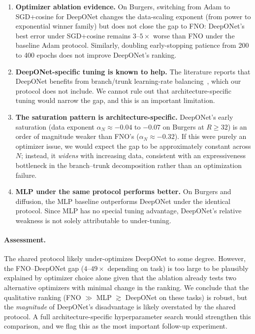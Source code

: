 \documentclass[11pt]{article}
\begin{document}
\begin{enumerate}[leftmargin=*,itemsep=2pt]
  \item \textbf{Optimizer ablation evidence.}
    On Burgers, switching from Adam to SGD+cosine for DeepONet
    changes the data-scaling exponent (from power to exponential
    winner family) but does not close the gap to FNO: DeepONet's
    best error under SGD+cosine remains $3$--$5\times$ worse than
    FNO under the baseline Adam protocol.
    Similarly, doubling early-stopping patience from 200 to 400
    epochs does not improve DeepONet's ranking.

  \item \textbf{DeepONet-specific tuning is known to help.}
    The literature reports that DeepONet benefits from
    branch/trunk learning-rate balancing~\citep{wang2021learning},
    which our protocol does not include.
    We cannot rule out that architecture-specific tuning would
    narrow the gap, and this is an important limitation.

  \item \textbf{The saturation pattern is architecture-specific.}
    DeepONet's early saturation (data exponent $\alpha_N \approx
    -0.04$ to $-0.07$ on Burgers at $R \geq 32$) is an order of
    magnitude weaker than FNO's ($\alpha_N \approx -0.32$).
    If this were purely an optimizer issue, we would expect the
    gap to be approximately constant across $N$; instead, it
    \emph{widens} with increasing data, consistent with an
    expressiveness bottleneck in the branch--trunk decomposition
    rather than an optimization failure.

  \item \textbf{MLP under the same protocol performs better.}
    On Burgers and diffusion, the MLP baseline outperforms DeepONet
    under the identical protocol. Since MLP has no special tuning
    advantage, DeepONet's relative weakness is not solely
    attributable to under-tuning.
\end{enumerate}

\paragraph{Assessment.}
The shared protocol likely under-optimizes DeepONet to some degree.
However, the FNO--DeepONet gap ($4$--$49\times$ depending on task) is
too large to be plausibly explained by optimizer choice alone given that
the ablation already tests two alternative optimizers with minimal
change in the ranking.
We conclude that the qualitative ranking (FNO $\gg$ MLP $\gtrsim$
DeepONet on these tasks) is robust, but the \emph{magnitude} of
DeepONet's disadvantage is likely overstated by the shared protocol.
A full architecture-specific hyperparameter search would strengthen
this comparison, and we flag this as the most important follow-up
experiment.
\end{document}
